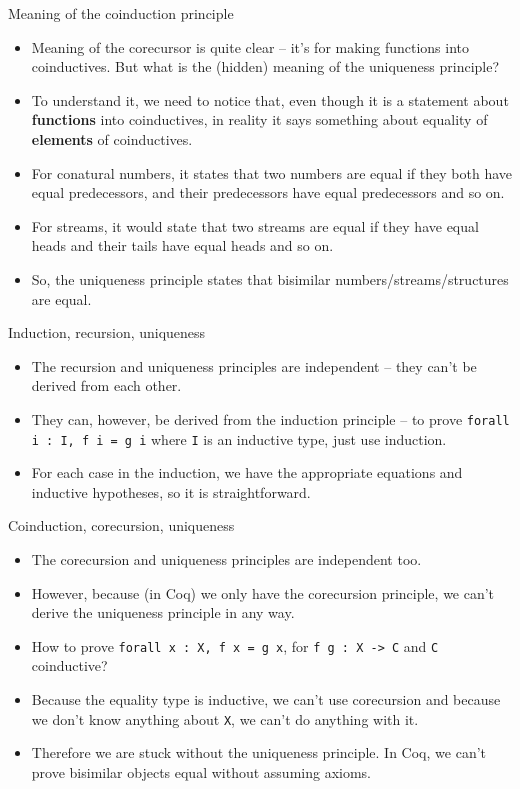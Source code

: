 \documentclass{beamer}
\begin{document}
\begin{frame}{Meaning of the coinduction principle}
\begin{itemize}
	\item Meaning of the corecursor is quite clear -- it's for making functions into coinductives. But what is the (hidden) meaning of the uniqueness principle?
	\item To understand it, we need to notice that, even though it is a statement about \textbf{functions} into coinductives, in reality it says something about equality of \textbf{elements} of coinductives.
	\item For conatural numbers, it states that two numbers are equal if they both have equal predecessors, and their predecessors have equal predecessors and so on.
	\item For streams, it would state that two streams are equal if they have equal heads and their tails have equal heads and so on.
	\item So, the uniqueness principle states that bisimilar numbers/streams/structures are equal.
\end{itemize}
\end{frame}

\begin{frame}{Induction, recursion, uniqueness}
\begin{itemize}
	\item The recursion and uniqueness principles are independent -- they can't be derived from each other.
	\item They can, however, be derived from the induction principle -- to prove \texttt{forall i : I, f i = g i} where \texttt{I} is an inductive type, just use induction.
	\item For each case in the induction, we have the appropriate equations and inductive hypotheses, so it is straightforward.
\end{itemize}
\end{frame}

\begin{frame}{Coinduction, corecursion, uniqueness}
\begin{itemize}
	\item The corecursion and uniqueness principles are independent too.
	\item However, because (in Coq) we only have the corecursion principle, we can't derive the uniqueness principle in any way.
	\item How to prove \texttt{forall x : X, f x = g x}, for \texttt{f g : X -> C} and \texttt{C} coinductive?
	\item Because the equality type is inductive, we can't use corecursion and because we don't know anything about \texttt{X}, we can't do anything with it.
	\item Therefore we are stuck without the uniqueness principle. In Coq, we can't prove bisimilar objects equal without assuming axioms.
\end{itemize}
\end{frame}
\end{document}
